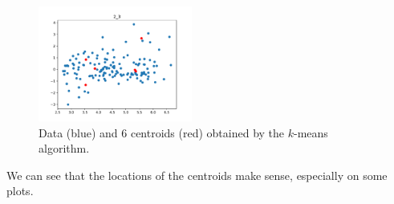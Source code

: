 \documentclass[11pt]{amsart}
\begin{document}
\begin{figure}
    \includegraphics[width=0.45\textwidth]{../plots/2_3.pdf}
    \caption{\label{fig:2dplots} Data (blue) and 6 centroids (red) obtained by the $k$-means algorithm.}
\end{figure}
We can see that the locations of the centroids make sense, especially on some plots.
\end{document}
